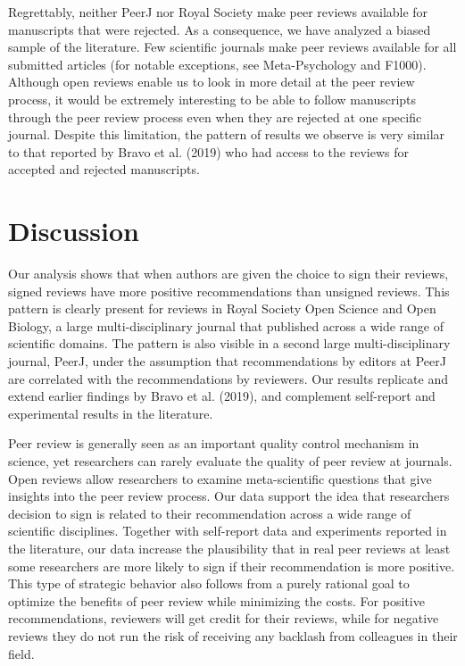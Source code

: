 \documentclass[,jou, a4paper,floatsintext]{apa6}
\begin{document}
Regrettably, neither PeerJ nor Royal Society make peer reviews available for manuscripts that were rejected. As a consequence, we have analyzed a biased sample of the literature. Few scientific journals make peer reviews available for all submitted articles (for notable exceptions, see Meta-Psychology and F1000). Although open reviews enable us to look in more detail at the peer review process, it would be extremely interesting to be able to follow manuscripts through the peer review process even when they are rejected at one specific journal. Despite this limitation, the pattern of results we observe is very similar to that reported by Bravo et al. (2019) who had access to the reviews for accepted and rejected manuscripts.

\hypertarget{discussion}{%
\section{Discussion}\label{discussion}}

Our analysis shows that when authors are given the choice to sign their reviews, signed reviews have more positive recommendations than unsigned reviews. This pattern is clearly present for reviews in Royal Society Open Science and Open Biology, a large multi-disciplinary journal that published across a wide range of scientific domains. The pattern is also visible in a second large multi-disciplinary journal, PeerJ, under the assumption that recommendations by editors at PeerJ are correlated with the recommendations by reviewers. Our results replicate and extend earlier findings by Bravo et al. (2019), and complement self-report and experimental results in the literature.

Peer review is generally seen as an important quality control mechanism in science, yet researchers can rarely evaluate the quality of peer review at journals. Open reviews allow researchers to examine meta-scientific questions that give insights into the peer review process. Our data support the idea that researchers decision to sign is related to their recommendation across a wide range of scientific disciplines. Together with self-report data and experiments reported in the literature, our data increase the plausibility that in real peer reviews at least some researchers are more likely to sign if their recommendation is more positive. This type of strategic behavior also follows from a purely rational goal to optimize the benefits of peer review while minimizing the costs. For positive recommendations, reviewers will get credit for their reviews, while for negative reviews they do not run the risk of receiving any backlash from colleagues in their field.
\end{document}
